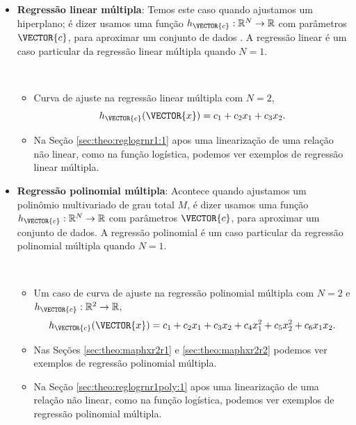 \begin{itemize}
\item \textbf{Regressão linear múltipla}:
Temos este caso quando ajustamos um hiperplano;
é dizer usamos uma função $h_{\VECTOR{c}}:\mathbb{R}^{N} \rightarrow \mathbb{R}$ com parâmetros $\VECTOR{c}$, 
para aproximar um conjunto de dados \cite[pp. 399, 418]{chapra2016metodos}.
A regressão linear é um caso particular da regressão linear múltipla quando $N=1$.
\begin{example}~
\begin{itemize}
\item Curva de ajuste na regressão linear múltipla com $N=2$, 
\begin{equation}
h_{\VECTOR{c}}(\VECTOR{x})=c_1+c_2 x_1+c_3 x_2.
\end{equation}
\item Na Seção \ref{sec:theo:reglogrnr1:1} apos uma linearização de uma relação não linear,
como na função logística, podemos ver exemplos de regressão linear múltipla.
\end{itemize}
\end{example}

\item \textbf{Regressão polinomial múltipla}:
Acontece quando ajustamos um polinômio multivariado de grau total $M$,
é dizer usamos uma função $h_{\VECTOR{c}}:\mathbb{R}^{N} \rightarrow \mathbb{R}$ com parâmetros $\VECTOR{c}$, 
para aproximar um conjunto de dados.
A regressão polinomial é um caso particular da regressão polinomial múltipla quando $N=1$.
\begin{example}~
\begin{itemize}
\item Um caso de curva de ajuste na regressão polinomial múltipla com $N=2$ e $h_{\VECTOR{c}}:\mathbb{R}^{2} \rightarrow \mathbb{R}$, 
\begin{equation}
h_{\VECTOR{c}}(\VECTOR{x})=c_1+c_2 x_1+c_3 x_2+c_4 x_1^2+c_5 x_2^2+c_6 x_1 x_2.
\end{equation}
\item Nas Seções \ref{sec:theo:maphxr2r1} e \ref{sec:theo:maphxr2r2} podemos ver exemplos de regressão polinomial múltipla.
\item Na Seção \ref{sec:theo:reglogrnr1poly:1} apos uma linearização de uma relação não linear,
como na função logística, podemos ver exemplos de regressão polinomial múltipla.
\end{itemize}
\end{example}


\end{itemize}

